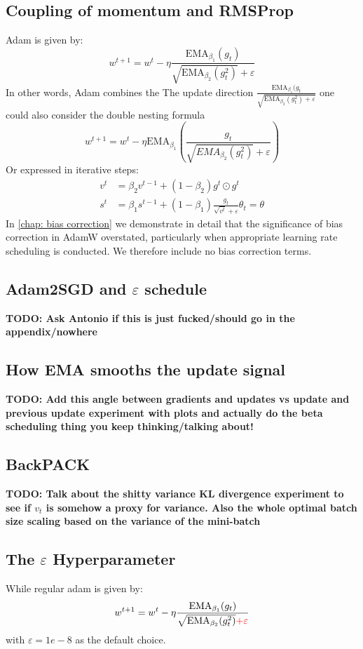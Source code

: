 \documentclass[12pt]{book}
\newcommand{\todo}[1]{{\color{red}\bf{TODO: #1}}}
\begin{document}
\subsection*{Coupling of momentum and RMSProp}
Adam is given by:
\[
w^{t+1} = w^{t} - \eta \frac{\text{EMA}_{\beta_1}(g_t)}{\sqrt{\text{EMA}_{\beta_2}(g_t ^2) } + \varepsilon  }
\]
In other words, Adam combines the 
The update direction $\frac{\text{EMA}_{\beta_1}(g_{t}}{\sqrt{\text{EMA}_{\beta_2}(g_t^2) + \varepsilon } }$ 
one could also consider the double nesting formula
\[
w^{t+1} = w^{t} - \eta \text{EMA}_{\beta_1} \left( \frac{g_t}{\sqrt{EMA_{\beta_2}(g_t^2)} + \varepsilon  } \right) 
\] 
Or expressed in iterative steps:
\begin{align*}
	v^{t} &= \beta_2v^{t-1} + (1-\beta_2)g^{t}\odot g^{t}\\
	s^{t} &= \beta_1s^{t-1} + (1-\beta_1) \frac{g_{t}}{\sqrt{v^{t}} + \varepsilon  }
	\theta_t = \theta_{}
\end{align*}
In \ref{chap: bias correction} we demonstrate in detail that the significance of bias correction in AdamW overstated, particularly when appropriate learning rate scheduling is conducted. We therefore include no bias correction terms. 

\subsection{Adam2SGD and $\varepsilon $ schedule}
\todo{Ask Antonio if this is just fucked/should go in the appendix/nowhere}
\subsection{How EMA smooths the update signal}
\todo{Add this angle between gradients and updates vs update and previous update experiment with plots and actually do the beta scheduling thing you keep thinking/talking about!}
\subsection{BackPACK}
\todo{Talk about the shitty variance KL divergence experiment to see if $v_t$ is somehow a proxy for variance. Also the whole optimal batch size scaling based on the variance of the mini-batch}
\subsection{The $\varepsilon $ Hyperparameter}
While regular adam is given by:
\[
	w^{t+1} = w^{t} - \eta \frac{\text{EMA}_{\beta_1}(g_t)}{\sqrt{\text{EMA}_{\beta_2}(g_t ^2) } \color{red}{+ \varepsilon  }}
\] 
with $\varepsilon = 1e-8$ as the default choice. 
\end{document}
